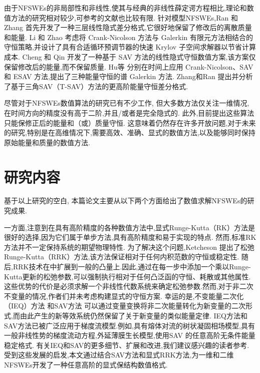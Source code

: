 由于NFSWEs的非局部性和非线性,使其与经典的非线性薛定谔方程相比,理论和数值方法的研究相对较少,可参考的文献也比较有限.
针对模型NFSWEs,Ran 和 Zhang \cite{ranLinearlyImplicitConservative2016} 首先开发了一种三层线性隐式差分格式,它很好地保留了修改后的离散质量和能量. 
Li 和 Zhao \cite{liFastEnergyConserving2018} 考虑将 Crank-Nicolson 方法与 Galerkin 有限元方法相结合的守恒策略,并设计了具有合适循环预调节器的快速 Krylov 子空间求解器以节省计算成本. 
Cheng 和 Qin \cite{chengConvergenceEnergyconservingScheme2022} 开发了一种基于 SAV 方法的线性隐式守恒数值方案,该方案仅保留修改后的能量,而不保留质量.
Hu等 \cite{huEfficientEnergyPreserving2022} 分别在时间上应用 Crank-Nicolson、SAV 和 ESAV 方法,提出了三种能量守恒的谱 Galerkin 方法.
Zhang和Ran \cite{zhangHighorderStructurepreservingDifference2023} 提出并分析了基于三角SAV（T-SAV）方法的更高阶能量守恒差分格式.


尽管对于NFSWEs数值算法的研究已有不少工作, 但大多数方法仅关注一维情况, 在时间方向的精度没有高于二阶,并且/或者是完全隐式的.
此外,目前提出这些算法只能保修正后的能量和（或）质量守恒.
这意味着仍然存在许多开放问题,对于未来的研究,特别是在高维情况下,需要高效、准确、显式的数值方法,以及能够同时保持原始能量和质量的数值方法.

\section{研究内容}
基于以上研究的空白, 本篇论文主要从以下两个方面给出了数值求解NFSWEs的研究成果.

一方面,注意到在具有高阶精度的各种数值方法中,显式Runge-Kutta（RK）方法是很好的选择,因为它们属于单步方法,具有高阶精度和易于实现的特点.
然而,标准RK方法并不一定保持系统的期望物理特性.
为了解决这个问题,Ketcheson \cite{ketchesonRelaxationRungeKutta2019} 提出了松弛Runge-Kutta（RRK）方法,该方法保证相对于任何内积范数的守恒或稳定性.
随后,RRK技术在\cite{ranochaRelaxationRungeKutta2020}中扩展到一般的凸量上.因此,通过在每一步中添加一个乘以Runge-Kutta更新的松弛参数,可以强制执行相对于任何凸泛函的守恒、耗散或其他属性.
这些优势的代价是必须求解一个非线性代数系统来确定松弛参数.然而,对于非二次不变量的情况,作者们并未考虑构建显式的守恒方案.
幸运的是,不变能量二次化（IEQ）方法 \cite{yangLinearUnconditionallyEnergy2017, yangEfficientLinearSchemes2017} 和SAV方法 \cite{chengConvergenceEnergyconservingScheme2022} 可以通过变量变换将非二次能量转化为新变量的二次形式,而由此产生的新等效系统仍然保留了关于新变量的类似能量定律.
IEQ方法和SAV方法已被广泛应用于梯度流模型.例如,具有熔体对流\cite{chenEfficientNumericalScheme2019}的树状凝固相场模型,具有一般非线性势的梯度流动方程\cite{yangConvergenceAnalysisInvariant2020},外延薄膜生长模型\cite{chengHighlyEfficientAccurate2019},使用SAV \cite{gongArbitrarilyHighorderUnconditionally2019}的任意高阶无条件能量稳定格式.
有关IEQ和SAV的更多细节、扩展和改进,我们建议感兴趣的读者参考\cite{zhaoNumericalApproximationsPhase2017,shenScalarAuxiliaryVariable2018,liuExponentialScalarAuxiliary2020,chengMultipleScalarAuxiliary2018}.
受到这些发展的启发,本文通过结合SAV方法和显式RRK方法,为一维和二维NFSWEs开发了一种任意高阶的显式保结构数值格式.

